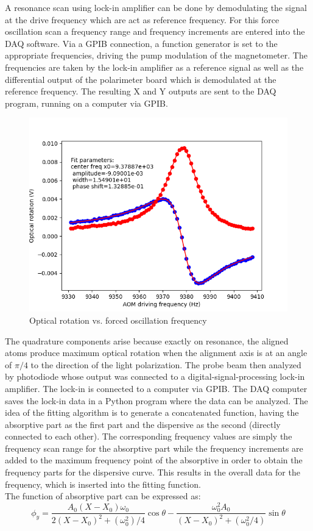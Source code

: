 A resonance scan using lock-in amplifier can be done by demodulating
the signal at the drive frequency which are act as reference
frequency. For this force oscillation scan a frequency range and
frequency increments are entered into the DAQ software. Via a GPIB
connection, a function generator is set to the appropriate
frequencies, driving the pump modulation of the magnetometer. The
frequencies are taken by the lock-in amplifier as a reference signal
as well as the differential output of the polarimeter board which is
demodulated at the reference frequency. The resulting X and Y outputs
are sent to the DAQ program, running on a computer via GPIB.
\begin{figure}[h]
\centering\includegraphics[width=0.4\linewidth]{figures/FM_NMOR}
\caption{Optical rotation vs. forced oscillation frequency}
\end{figure}
 The quadrature components arise because exactly on resonance, the aligned atoms produce maximum optical rotation when the alignment axis is at an angle of $ \pi/4$   to the direction of the light polarization.  
The probe beam then analyzed by photodiode whose output was connected to a digital-signal-processing lock-in amplifier. The lock-in is connected to a computer via GPIB. The DAQ computer saves the lock-in data in  a Python program where the data can be analyzed. The idea of the fitting algorithm is to generate a concatenated function, having the absorptive part as the first part and the dispersive as the second (directly connected to each other). The corresponding frequency values are simply the frequency scan range for the absorptive part while the frequency increments are added to the maximum frequency point of the absorptive in order to obtain the frequency parts for the dispersive curve. This results in
the overall data for the frequency, which is inserted into the fitting function.\\
The function of absorptive part can be expressed as:
\begin{equation}
\phi_y= \frac{A_0 (X-X_0 )\omega_0}{2(X-X_0 )^2+(\omega_0^2)/4}\cos\theta-\frac{\omega_0^2A_0}{(X-X_0 )^2+(\omega_0^2/4)}\sin\theta
\end{equation}
